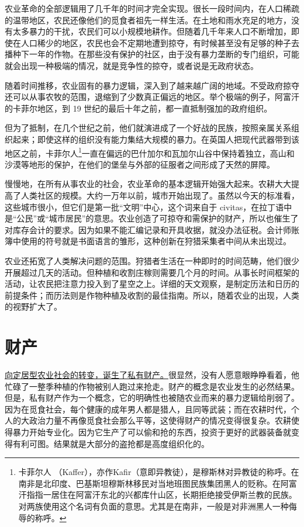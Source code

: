 农业革命的全部逻辑用了几千年的时间才完全实现。很长一段时间内，在人口稀疏的温带地区，农民还像他们的觅食者祖先一样生活。在土地和雨水充足的地方，没有太多暴力的干扰，农民们可以小规模地耕作。但随着几千年来人口不断增加，即使在人口稀少的地区，农民也会不定期地遭到掠夺，有时候甚至没有足够的种子去播种下一年的作物。在那些没有保护的社区，由于没有暴力垄断的专门组织，可能就会出现一种极端的情况，就是竞争性的掠夺，或者说是无政府状态。

随着时间推移，农业固有的暴力逻辑，深入到了越来越广阔的地域。不受政府掠夺还可以从事农牧的范围，退缩到了少数真正偏远的地区。举个极端的例子，阿富汗的卡菲尔地区，到 19 世纪的最后十年之前，都一直抵制强加的政府组织。

但为了抵制，在几个世纪之前，他们就演进成了一个好战的民族，按照亲属关系组织起来；即使这样的组织没有能力集结大规模的暴力。在英国人把现代武器带到该地区之前，卡菲尔人\footnote{卡菲尔人 （Kaffer），亦作Kafir（意即异教徒），是穆斯林对异教徒的称呼。在南非是北印度、巴基斯坦穆斯林移民对当地班图民族集团黑人的贬称。在阿富汗指指一居住在阿富汗东北的兴都库什山区，长期拒绝接受伊斯兰教的民族。对两族使用这个名词有负面的意思。尤其是在南非，一般是对非洲黑人一种侮辱的称呼。}一直在偏远的巴什加尔和瓦加尔山谷中保持着独立，高山和沙漠等地形的保护，在他们的堡垒与外部的征服者之间形成了天然的屏障。

慢慢地，在所有从事农业的社会，农业革命的基本逻辑开始强大起来。农耕大大提高了人类社区的规模。大约一万年以前，城市开始出现了。虽然以今天的标准看，这些城市很小，但它们是第一批“文明”中心，这个词来自于 civitas，在拉丁语中是“公民”或“城市居民”的意思。农业创造了可掠夺和需保护的财产，所以也催生了对库存会计的要求。因为如果不能汇编记录和开具收据，就没办法征税。会计师账簿中使用的符号就是书面语言的雏形，这种创新在狩猎采集者中间从未出现过。

农业还拓宽了人类解决问题的范围。狩猎者生活在一种即时的时间范畴，他们很少开展超过几天的活动。但种植和收割庄稼则需要几个月的时间。从事长时间框架的活动，让农民把注意力投入到了星空之上。详细的天文观察，是制定历法和日历的前提条件；而历法则是作物种植及收割的最佳指南。所以，随着农业的出现，人类的视野扩大了。

\section{财产}
\uline{向定居型农业社会的转变，诞生了私有财产。}很显然，没有人愿意眼睁睁看着，他忙碌了一整季种植的作物被别人跑过来抢走。财产的概念是农业发生的必然结果。但是，私有财产作为一个概念，它的明确性也被随农业而来的暴力逻辑给削弱了。因为在觅食社会，每个健康的成年男人都是猎人，且同等武装；而在农耕时代，个人的大政治力量不再像觅食社会那么平等，这使得财产的情况变得很复杂。农耕使得暴力开始专业化。因为它生产了可以偷和抢的东西，投资于更好的武器装备就变得有利可图。结果就是大部分的盗抢都是高度组织化的。

